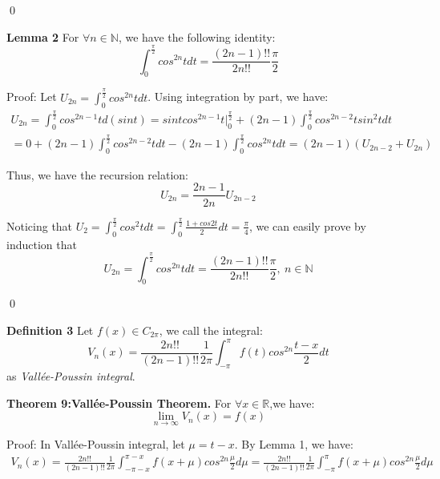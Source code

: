 \documentclass[12pt]{article}
\begin{document}
\par \qed
\par {\textbf{Lemma 2}} For $\forall n\in\mathbb{N}$, we have the following identity:
\begin{equation*}
\int_{0}^{\frac{\pi}{2}}cos^{2n}tdt=\frac{(2n-1)!!}{2n!!}\frac{\pi}{2}
\end{equation*}
\par Proof: Let $U_{2n}=\int_{0}^{\frac{\pi}{2}}cos^{2n}tdt$. Using integration by part, we have:
\[
\begin{split}
U_{2n}=\int_{0}^{\frac{\pi}{2}}cos^{2n-1}td(sint)=sintcos^{2n-1}t\Big|_0^{\frac{\pi}{2}}+(2n-1)\int_{0}^{\frac{\pi}{2}}cos^{2n-2}tsin^2tdt\\
=0+(2n-1)\int_{0}^{\frac{\pi}{2}}cos^{2n-2}tdt-(2n-1)\int_{0}^{\frac{\pi}{2}}cos^{2n}tdt=(2n-1)(U_{2n-2}+U_{2n})
\end{split}
\]
\par Thus, we have the recursion relation:
\begin{equation*}
U_{2n}=\frac{2n-1}{2n}U_{2n-2}
\end{equation*}
\par Noticing that $U_2=\int_{0}^{\frac{\pi}{2}}cos^{2}tdt=\int_{0}^{\frac{\pi}{2}}\frac{1+cos2t}{2}dt=\frac{\pi}{4}$, we can easily prove by induction that
\begin{equation*}
U_{2n}=\int_{0}^{\frac{\pi}{2}}cos^{2n}tdt=\frac{(2n-1)!!}{2n!!}\frac{\pi}{2},\ n\in \mathbb{N}
\end{equation*}
\par \qed
\par {\textbf{Definition 3}} Let $f(x)\in C_{2\pi}$, we call the integral:
\begin{equation*}
V_n(x)=\frac{2n!!}{(2n-1)!!}\frac{1}{2\pi}\int_{-\pi}^{\pi}f(t)cos^{2n}\frac{t-x}{2}dt
\end{equation*}
as \emph{Vall\'{e}e-Poussin integral}.
\par {\textbf{Theorem 9:}}\textbf{Vall\'{e}e-Poussin Theorem.} For $\forall x\in\mathbb{R}$,we have:
\begin{equation*}
\lim_{n\to\infty}V_n(x)=f(x)
\end{equation*}
\par Proof: In Vall\'{e}e-Poussin integral, let $\mu=t-x$. By Lemma 1, we have:
\[
\begin{split}
V_n(x)=\frac{2n!!}{(2n-1)!!}\frac{1}{2\pi}\int_{-\pi-x}^{\pi-x}f(x+\mu)cos^{2n}\frac{\mu}{2}d\mu
=\frac{2n!!}{(2n-1)!!}\frac{1}{2\pi}\int_{-\pi}^{\pi}f(x+\mu)cos^{2n}\frac{\mu}{2}d\mu
\end{split}
\]
\end{document}
